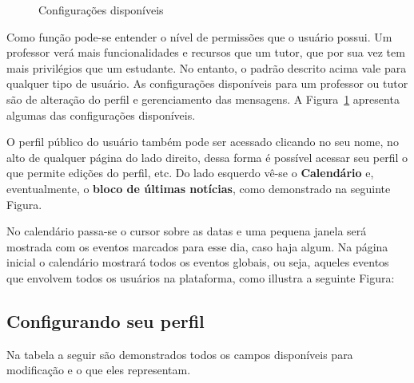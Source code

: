 \begin{figure}[htbp]
 \begin{center}
  \caption{Configurações disponíveis}
  \label{fig:conf disp}
 \end{center}
\end{figure}


Como função pode-se entender o nível de permissões que o usuário possui. Um professor verá mais funcionalidades e recursos que um tutor, que por sua vez tem mais privilégios que um estudante. No entanto, o padrão descrito acima vale para qualquer tipo de usuário. As configurações disponíveis para um professor ou tutor são de alteração do perfil e gerenciamento das mensagens. A Figura~\ref{fig:conf disp} apresenta algumas das configurações disponíveis.


O perfil público do usuário também pode ser acessado clicando no seu nome, no alto de qualquer página do lado direito, dessa forma é possível acessar seu perfil o que permite edições do perfil, etc. Do lado esquerdo vê-se o \textbf{Calendário} e, eventualmente, o \textbf{bloco de últimas notícias}, como demonstrado na seguinte Figura.

\begin{center}
\end{center}

No calendário passa-se o cursor sobre as datas e uma pequena janela será mostrada com os eventos marcados para esse dia, caso haja algum. Na página inicial o calendário mostrará todos os eventos globais, ou seja, aqueles eventos que envolvem todos os usuários na plataforma, como illustra a seguinte Figura:

\begin{center}
\end{center}


\subsection{Configurando seu perfil}
Na tabela a seguir são demonstrados todos os campos disponíveis para modificação e o que eles representam.

